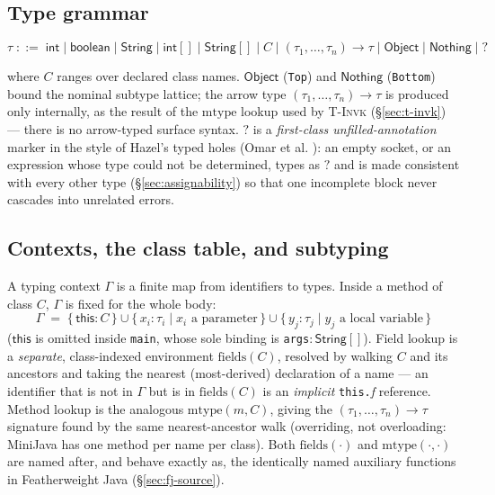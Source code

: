 \documentclass[11pt]{article}
\newcommand{\rulename}[1]{\textsc{#1}}
\newcommand{\mtype}{\mathrm{mtype}}
\newcommand{\fields}{\mathrm{fields}}
\newcommand{\Hole}{\mathord{?}}
\begin{document}
\subsection{Type grammar}

\[
  \tau \;::=\; \mathsf{int} \mid \mathsf{boolean} \mid \mathsf{String}
             \mid \mathsf{int[]} \mid \mathsf{String[]}
             \mid C
             \mid (\tau_1,\ldots,\tau_n)\!\to\!\tau
             \mid \mathsf{Object} \mid \mathsf{Nothing} \mid \Hole
\]

where $C$ ranges over declared class names. $\mathsf{Object}$
(\texttt{Top}) and $\mathsf{Nothing}$ (\texttt{Bottom}) bound the nominal
subtype lattice; the arrow type $(\tau_1,\ldots,\tau_n)\!\to\!\tau$ is
produced only internally, as the result of the $\mtype$ lookup used by
\rulename{T-Invk} (\S\ref{sec:t-invk}) --- there is no arrow-typed surface
syntax. $\Hole$ is a \emph{first-class unfilled-annotation} marker in the
style of Hazel's typed holes (Omar et al.
\cite{omar2017hazelnut,omar2019livelits}): an empty socket, or an expression
whose type could not be determined, types as $\Hole$ and is made consistent
with every other type (\S\ref{sec:assignability}) so that one incomplete
block never cascades into unrelated errors.

\subsection{Contexts, the class table, and subtyping}

A typing context $\Gamma$ is a finite map from identifiers to types. Inside a
method of class $C$, $\Gamma$ is fixed for the whole body:
\[
  \Gamma \;=\; \{\, \mathsf{this} : C \,\} \cup
  \{\, x_i : \tau_i \mid x_i \text{ a parameter} \,\} \cup
  \{\, y_j : \tau_j \mid y_j \text{ a local variable} \,\}
\]
($\mathsf{this}$ is omitted inside \texttt{main}, whose sole binding is
\texttt{args}$:\mathsf{String[]}$). Field lookup is a \emph{separate},
class-indexed environment $\fields(C)$, resolved by walking $C$ and its
ancestors and taking the nearest (most-derived) declaration of a name --- an
identifier that is not in $\Gamma$ but is in $\fields(C)$ is an
\emph{implicit} \texttt{this.}\emph{f} reference. Method lookup is the
analogous $\mtype(m, C)$, giving the $(\tau_1,\ldots,\tau_n)\!\to\!\tau$
signature found by the same nearest-ancestor walk (overriding, not
overloading: MiniJava has one method per name per class). Both
$\fields(\cdot)$ and $\mtype(\cdot,\cdot)$ are named after, and behave
exactly as, the identically named auxiliary functions in Featherweight Java
\cite{igarashi2001fj} (\S\ref{sec:fj-source}).
\end{document}
